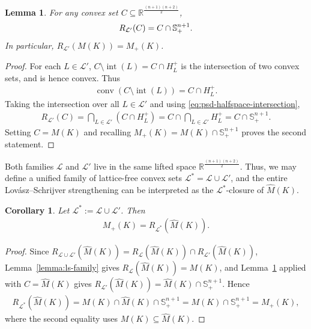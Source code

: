 \documentclass{article}
\newtheorem{corollary}{Corollary}
\newtheorem{lemma}{Lemma}
\newcommand{\R}{\mathbb{R}}
\renewcommand{\L}{\mathcal{L}}
\begin{document}
\begin{lemma} \label{lemma:ls-psd-strengthen}
    For any convex set $C \subseteq \R^{\frac{(n+1)(n+2)}{2}}$,
    \begin{align}
        R_{\L'}(C) = C \cap \mathbb{S}^{n+1}_+. \notag
    \end{align}
    In particular, $R_{\L'}(M(K)) = M_+(K)$.
\end{lemma}

\begin{proof}
    For each $L \in \L'$, $C \setminus \operatorname{int}(L) = C \cap H^+_L$ is the intersection of two convex sets, and is hence convex. Thus
    \begin{align}
        \operatorname{conv}(C \setminus \operatorname{int}(L)) = C \cap H^+_L.
    \end{align}
    Taking the intersection over all $L \in \L'$ and using \eqref{eq:psd-halfspace-intersection},
    \begin{align}
        R_{\L'}(C) = \bigcap_{L \in \L'}(C \cap H^+_L) = C \cap \bigcap_{L \in \L'} H^+_L = C \cap \mathbb{S}^{n+1}_+.
    \end{align}
    Setting $C = M(K)$ and recalling $M_+(K) = M(K) \cap \mathbb{S}^{n+1}_+$ proves the second statement.
\end{proof}

\medskip

Both families $\L$ and $\L'$ live in the same lifted space $\R^{\frac{(n+1)(n+2)}{2}}$. Thus, we may define a unified family of lattice-free convex sets $\L^* = \L \cup \L'$, and the entire Lov\'asz--Schrijver strengthening can be interpreted as the $\L^*$-closure of $\hat M(K)$.

\begin{corollary} \label{cor3}
    Let $\L^* := \L \cup \L'$. Then
    \begin{align}
        M_+(K) = R_{\L^*}(\hat M(K)).
    \end{align}
\end{corollary}

\begin{proof}
    Since $R_{\L \cup \L'}(\hat M(K)) = R_\L(\hat M(K)) \cap R_{\L'}(\hat M(K))$, Lemma~\ref{lemma:ls-family} gives $R_\L(\hat M(K)) = M(K)$, and Lemma~\ref{lemma:ls-psd-strengthen} applied with $C = \hat M(K)$ gives $R_{\L'}(\hat M(K)) = \hat M(K) \cap \mathbb{S}^{n+1}_+$. Hence
    \begin{align}
        R_{\L^*}(\hat M(K)) = M(K) \cap \hat M(K) \cap \mathbb{S}^{n+1}_+ = M(K) \cap \mathbb{S}^{n+1}_+ = M_+(K),
    \end{align}
    where the second equality uses $M(K) \subseteq \hat M(K)$.
\end{proof}
\end{document}
